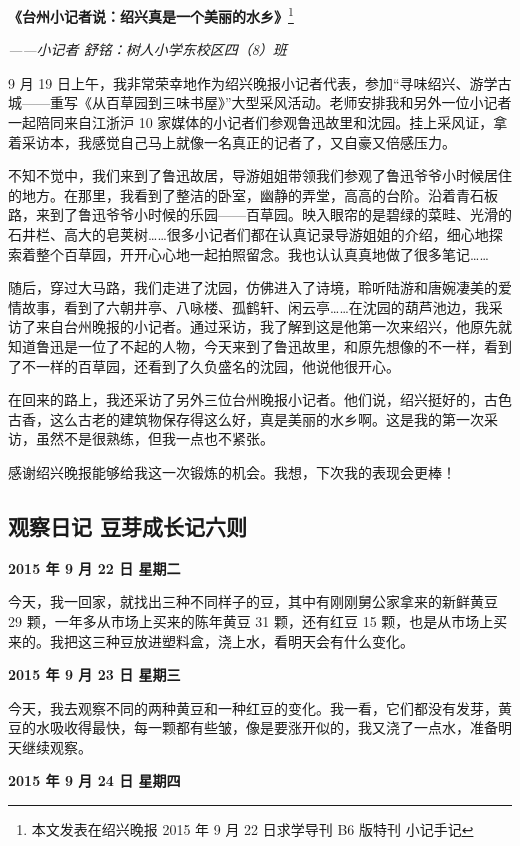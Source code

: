 \documentclass[UTF8,a4paper,titlepage,twoside,10.5pt]{article}
\begin{document}
\textbf{《台州小记者说：绍兴真是一个美丽的水乡》}\footnote{本文发表在绍兴晚报 2015 年 9 月 22 日求学导刊 B6 版特刊 小记手记}

\emph{——小记者 舒铭：树人小学东校区四（8）班}

9 月 19 日上午，我非常荣幸地作为绍兴晚报小记者代表，参加“寻味绍兴、游学古城——重写《从百草园到三味书屋》”大型采风活动。老师安排我和另外一位小记者一起陪同来自江浙沪 10 家媒体的小记者们参观鲁迅故里和沈园。挂上采风证，拿着采访本，我感觉自己马上就像一名真正的记者了，又自豪又倍感压力。

不知不觉中，我们来到了鲁迅故居，导游姐姐带领我们参观了鲁迅爷爷小时候居住的地方。在那里，我看到了整洁的卧室，幽静的弄堂，高高的台阶。沿着青石板路，来到了鲁迅爷爷小时候的乐园——百草园。映入眼帘的是碧绿的菜畦、光滑的石井栏、高大的皂荚树……很多小记者们都在认真记录导游姐姐的介绍，细心地探索着整个百草园，开开心心地一起拍照留念。我也认认真真地做了很多笔记……

随后，穿过大马路，我们走进了沈园，仿佛进入了诗境，聆听陆游和唐婉凄美的爱情故事，看到了六朝井亭、八咏楼、孤鹤轩、闲云亭……在沈园的葫芦池边，我采访了来自台州晚报的小记者。通过采访，我了解到这是他第一次来绍兴，他原先就知道鲁迅是一位了不起的人物，今天来到了鲁迅故里，和原先想像的不一样，看到了不一样的百草园，还看到了久负盛名的沈园，他说他很开心。

在回来的路上，我还采访了另外三位台州晚报小记者。他们说，绍兴挺好的，古色古香，这么古老的建筑物保存得这么好，真是美丽的水乡啊。这是我的第一次采访，虽然不是很熟练，但我一点也不紧张。

感谢绍兴晚报能够给我这一次锻炼的机会。我想，下次我的表现会更棒！

\subsection{观察日记  豆芽成长记六则}
\label{sec:orgcd29204}

\textbf{2015 年 9 月 22 日    星期二}

今天，我一回家，就找出三种不同样子的豆，其中有刚刚舅公家拿来的新鲜黄豆 29 颗，一年多从市场上买来的陈年黄豆 31 颗，还有红豆 15 颗，也是从市场上买来的。我把这三种豆放进塑料盒，浇上水，看明天会有什么变化。

\textbf{2015 年 9 月 23 日    星期三}

今天，我去观察不同的两种黄豆和一种红豆的变化。我一看，它们都没有发芽，黄豆的水吸收得最快，每一颗都有些皱，像是要涨开似的，我又浇了一点水，准备明天继续观察。

\textbf{2015 年 9 月 24 日    星期四}
\end{document}
